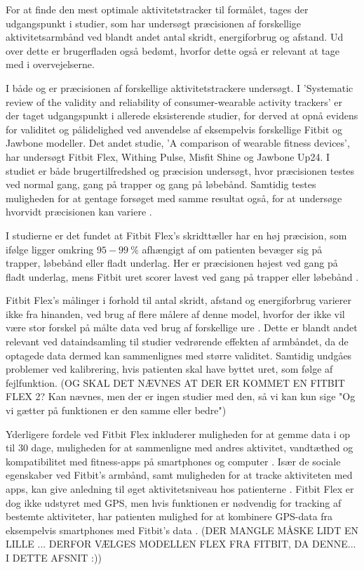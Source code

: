 For at finde den mest optimale aktivitetstracker til formålet, tages der udgangspunkt i studier, som har undersøgt præcisionen af forskellige aktivitetsarmbånd ved blandt andet antal skridt, energiforbrug og afstand. Ud over dette er brugerfladen også bedømt, hvorfor dette også er relevant at tage med i overvejelserne.

I både \citep{evenson2015} og \citep{kaewkannate2016} er præcisionen af forskellige aktivitetstrackere undersøgt. I 'Systematic review of the validity and reliability of consumer-wearable activity trackers' er der taget udgangspunkt i allerede eksisterende studier, for derved at opnå evidens for validitet og pålidelighed ved anvendelse af eksempelvis forskellige Fitbit og Jawbone modeller. Det andet studie, 'A comparison of wearable fitness devices', har undersøgt Fitbit Flex, Withing Pulse, Misfit Shine og Jawbone Up24. I studiet er både brugertilfredshed og præcision undersøgt, hvor præcisionen testes ved normal gang, gang på trapper og gang på løbebånd. Samtidig testes muligheden for at gentage forsøget med samme resultat også, for at undersøge hvorvidt præcisionen kan variere \citep{evenson2015, kaewkannate2016}.

 I studierne er det fundet at Fitbit Flex's skridttæller har en høj præcision, som ifølge \citep{kaewkannate2016} ligger omkring  $95-99~\%$ afhængigt af om patienten bevæger sig på trapper, løbebånd eller fladt underlag. Her er præcisionen højest ved gang på fladt underlag, mens Fitbit uret scorer lavest ved gang på trapper eller løbebånd \citep{kaewkannate2016}. 

Fitbit Flex's målinger i forhold til antal skridt, afstand og energiforbrug varierer ikke fra hinanden, ved brug af flere målere af denne model, hvorfor der ikke vil være stor forskel på målte data ved brug af forskellige ure \citep{evenson2015}. Dette er blandt andet relevant ved dataindsamling til studier vedrørende effekten af armbåndet, da de optagede data dermed kan sammenlignes med større validitet. Samtidig undgåes problemer ved kalibrering, hvis patienten skal have byttet uret, som følge af fejlfunktion. (OG SKAL DET NÆVNES AT DER ER KOMMET EN FITBIT FLEX 2? Kan nævnes, men der er ingen studier med den, så vi kan kun sige "Og vi gætter på funktionen er den samme eller bedre")

Yderligere fordele ved Fitbit Flex inkluderer muligheden for at gemme data i op til $30$ dage, muligheden for at sammenligne med andres aktivitet, vandtæthed og kompatibilitet med fitness-apps på smartphones og computer \citep{kaewkannate2016, fitbitflex}. Især de sociale egenskaber ved Fitbit's armbånd, samt muligheden for at tracke aktiviteten med apps, kan give anledning til øget aktivitetsniveau hos patienterne \citep{karapanos2016, rooksby2014}. Fitbit Flex er dog ikke udstyret med GPS, men hvis funktionen er nødvendig for tracking af bestemte aktiviteter, har patienten mulighed for at kombinere GPS-data fra eksempelvis smartphones med Fitbit's data \citep{fitbitflex}. (DER MANGLE MÅSKE LIDT EN LILLE ... DERFOR VÆLGES MODELLEN FLEX FRA FITBIT, DA DENNE... I DETTE AFSNIT :))